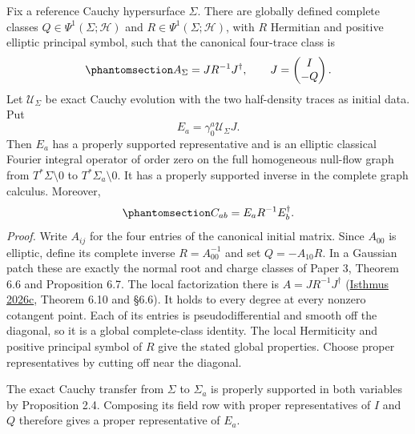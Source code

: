 \documentclass[
  english,
  11pt,
  reqno]{amsart}
\begin{document}
Fix a reference Cauchy hypersurface \(\Sigma\). There are globally
defined complete classes \(Q\in\Psi^1(\Sigma;\mathcal H)\) and
\(R\in\Psi^1(\Sigma;\mathcal H)\), with \(R\) Hermitian and positive
elliptic principal symbol, such that the canonical four-trace class is
\begin{equation}\protect\phantomsection\label{eq:global-positive-initial-factorization}{
A_\Sigma=JR^{-1}J^\dagger,\qquad
J=\begin{pmatrix}I\\-Q\end{pmatrix}.
}\end{equation} Let \(\mathcal U_\Sigma\) be exact Cauchy evolution with
the two half-density traces as initial data. Put \[
E_a=\gamma_0^a\mathcal U_\Sigma J.
\] Then \(E_a\) has a properly supported representative and is an
elliptic classical Fourier integral operator of order zero on the full
homogeneous null-flow graph from \(T^*\Sigma\setminus0\) to
\(T^*\Sigma_a\setminus0\). It has a properly supported inverse in the
complete graph calculus. Moreover,
\begin{equation}\protect\phantomsection\label{eq:global-positive-graph-factorization}{
C_{ab}=E_aR^{-1}E_b^\dagger.
}\end{equation} \emph{Proof.} Write \(A_{ij}\) for the four entries of
the canonical initial matrix. Since \(A_{00}\) is elliptic, define its
complete inverse \(R=A_{00}^{-1}\) and set \(Q=-A_{10}R\). In a Gaussian
patch these are exactly the normal root and charge classes of Paper 3,
Theorem 6.6 and Proposition 6.7. The local factorization there is
\(A=JR^{-1}J^\dagger\) (\hyperref[ref-IsthmusSmooth2026]{Isthmus 2026c},
Theorem 6.10 and §6.6). It holds to every degree at every nonzero
cotangent point. Each of its entries is pseudodifferential and smooth
off the diagonal, so it is a global complete-class identity. The local
Hermiticity and positive principal symbol of \(R\) give the stated
global properties. Choose proper representatives by cutting off near the
diagonal.

The exact Cauchy transfer from \(\Sigma\) to \(\Sigma_a\) is properly
supported in both variables by Proposition 2.4. Composing its field row
with proper representatives of \(I\) and \(Q\) therefore gives a proper
representative of \(E_a\).
\end{document}
